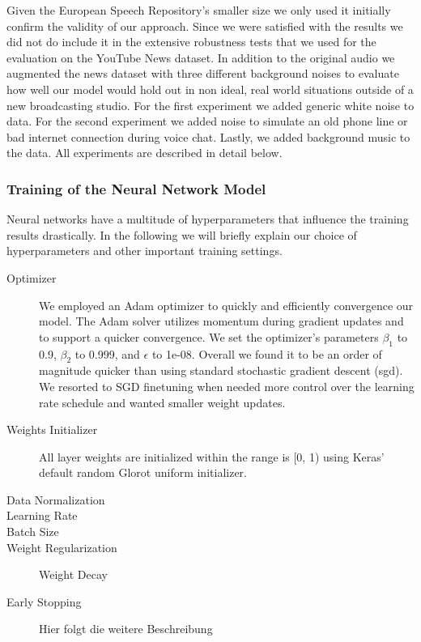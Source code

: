 Given the European Speech Repository's smaller size we only used it initially confirm the validity of our approach. Since we were satisfied with the results we did not do include it in the extensive robustness tests that we used for the evaluation on the YouTube News dataset. In addition to the original audio we augmented the news dataset with three different background noises to evaluate how well our model would hold out in non ideal, real world situations outside of a new broadcasting studio. For the first experiment we added generic white noise to data. For the second experiment we added noise to simulate an old phone line or bad internet connection during voice chat. Lastly, we added background music to the data. All experiments are described in detail below.


\subsubsection{Training of the Neural Network Model} 
\label{sec:training}
Neural networks have a multitude of hyperparameters that influence the training results drastically. In the following we will briefly explain our choice of hyperparameters and other important training settings.

	\begin{description}
	\item[Optimizer] We employed an Adam\cite{kingma2014adam} optimizer to quickly and efficiently convergence our model. The Adam solver utilizes momentum during gradient updates and to support a quicker convergence. We set the optimizer's parameters $\beta_1$ to 0.9, $\beta_2$ to 0.999, and $\epsilon$ to 1e-08. Overall we found it to be an order of magnitude quicker than using standard stochastic gradient descent (\ac{sgd}). We resorted to SGD finetuning when needed more control over the learning rate schedule and wanted smaller weight updates.
	\item[Weights Initializer] All layer weights are initialized within the range is [0, 1) using Keras' default random Glorot uniform initializer\cite{glorot2010understanding}.
	\item[Data Normalization]
	\item[Learning Rate]
	\item[Batch Size]
	\item[Weight Regularization] Weight Decay
	\item[Early Stopping] Hier folgt die weitere Beschreibung
	\end{description}

